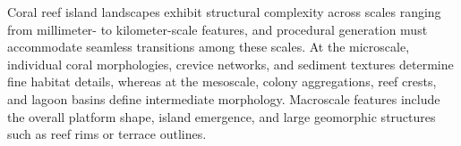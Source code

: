 Coral reef island landscapes exhibit structural complexity across scales ranging from millimeter- to kilometer-scale features, and procedural generation must accommodate seamless transitions among these scales. At the microscale, individual coral morphologies, crevice networks, and sediment textures determine fine habitat details, whereas at the mesoscale, colony aggregations, reef crests, and lagoon basins define intermediate morphology. Macroscale features include the overall platform shape, island emergence, and large geomorphic structures such as reef rims or terrace outlines. 




